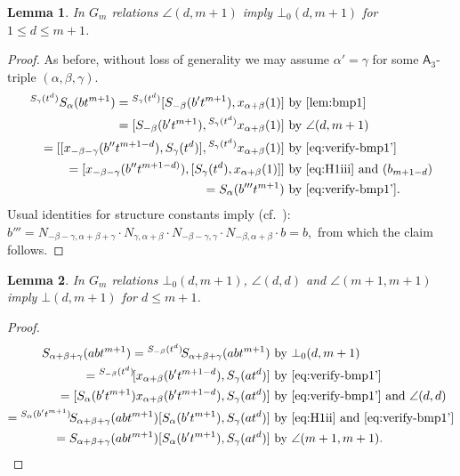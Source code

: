 \documentclass[oneside, 10pt]{amsart}
\numberwithin{equation}{section}
\newtheorem{lemma}{Lemma}
\numberwithin{lemma}{section}
\theoremstyle{definition}
\theoremstyle{remark}
\begin{document}
\begin{lemma} \label{claim2} In $G_m$ relations $\angle(d, m+1)$ imply $\bot_0(d, m+1)$ for  $1\leq d\leq m+1$. \end{lemma}
\begin{proof}
As before, without loss of generality we may assume $\alpha' = \gamma$ for some $\mathsf{A}_3$-triple $(\alpha, \beta, \gamma)$.
 \begin{align*}
 {}^{S_\gamma(t^d)}S_\alpha(bt^{m+1}) = {}^{S_\gamma(t^d)}[S_{-\beta}(b't^{m+1}), x_{\alpha+\beta}(1)] & \text{ by~\cref{lem:bmp1}}\\
 = [S_{-\beta}(b't^{m+1}), {}^{S_\gamma(t^d)}x_{\alpha+\beta}(1)]                                     
 & \text{ by $\angle(d, m+1)$}\\
 = [[x_{-\beta-\gamma}(b''t^{m+1-d}), S_\gamma(t^d)], {}^{S_\gamma(t^d)}x_{\alpha+\beta}(1)]          
 & \text{ by~\eqref{eq:verify-bmp1'}}\\
 = [x_{-\beta-\gamma}(b''t^{m+1-d)}), [S_\gamma(t^d), x_{\alpha+\beta}(1)]]                           
 & \text{ by~\eqref{eq:H1iii} and $(b_{m+1-d})$}\\
 = S_{\alpha}(b'''t^{m+1})                                                                            
 & \text{ by~\eqref{eq:verify-bmp1'}.} \end{align*}
Usual identities for structure constants imply (cf.~\cite[p.~12]{Re75}):
 $b'''=N_{-\beta-\gamma, \alpha+\beta+\gamma} \cdot N_{\gamma, \alpha+\beta} \cdot N_{-\beta-\gamma, \gamma} \cdot N_{-\beta, \alpha+\beta} \cdot b = b,$ from which the claim follows.
\end{proof}

\begin{lemma} \label{claim3}
 In $G_m$ relations $\bot_0(d, m+1)$, $\angle(d, d)$ and $\angle(m+1, m+1)$ imply $\bot(d, m+1)$ for $d\leq m+1$.
\end{lemma}
\begin{proof}
 \begin{align*} 
 S_{\alpha+\beta+\gamma}(abt^{m+1}) = {}^{S_{-\beta}(t^d)}\!S_{\alpha+\beta+\gamma}(abt^{m+1}) 
 & \text{ by $\bot_0(d, m+1)$}\\
 = {}^{S_{-\beta}(t^d)}\![x_{\alpha+\beta}(b't^{m+1-d}), S_\gamma(at^d)] 
 & \text{ by~\eqref{eq:verify-bmp1'}} \\
 = [S_{\alpha}(b't^{m+1}) x_{\alpha+\beta}(b't^{m+1-d}), S_\gamma(at^d)] 
 & \text{ by~\eqref{eq:verify-bmp1'} and $\angle(d, d)$ }\\
 = {}^{S_{\alpha}(b't^{m+1})}\!S_{\alpha+\beta+\gamma}(abt^{m+1}) [S_{\alpha}(b't^{m+1}), S_\gamma(at^d)] 
 & \text{ by~\eqref{eq:H1ii} and~\eqref{eq:verify-bmp1'}} \\
 = S_{\alpha+\beta+\gamma}(abt^{m+1}) [S_{\alpha}(b't^{m+1}), S_\gamma(at^d)] 
 & \text{ by $\angle(m+1, m+1)$. \qedhere}
\end{align*}
\end{proof}
\end{document}
